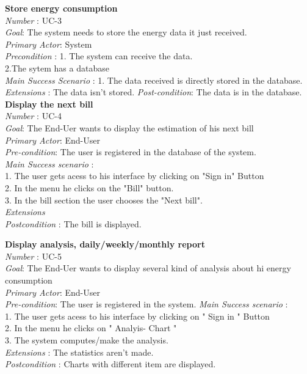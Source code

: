 \textbf{Store energy consumption}\\
\textit{Number} : UC-3 \\
\textit{Goal}: The system needs to store the energy data it just received. \\
\textit{Primary Actor}: System \\
\textit{Precondition} : 1. The system can receive the data. \\
2.The sytem has a database \\
\textit{Main Success Scenario} : 1. The data received is directly stored in the database. \\
\textit{Extensions} : The data isn't stored. %
\textit{Post-condition}: The data is in the database.\\

\textbf{Display the next bill}\\
\textit{Number} : UC-4 \\
\textit{Goal}: The End-Uer wants to display the estimation of his next bill \\ 
\textit{Primary Actor}:  End-User \\
\textit{Pre-condition}: The user is registered in the database of the system.\\
\textit{Main Success scenario} : \\
1. The user gets acess to his interface by clicking on "Sign in" Button\\ %
2. In the menu he clicks on the "Bill" button.\\
3. In the bill section the user chooses the "Next bill". \\ %
\textit{Extensions} \\
\textit{Postcondition} : The bill is displayed.

\textbf{Display analysis, daily/weekly/monthly report}\\ %
\textit{Number} : UC-5 \\
\textit{Goal}: The End-Uer wants to display several kind of analysis about hi energy consumption \\ 
\textit{Primary Actor}: End-User \\
\textit{Pre-condition}: The user is registered in the system.
\textit{Main Success scenario} : \\
1. The user gets acess to his interface by clicking on " Sign in " Button \\
2. In the menu he clicks on " Analyis- Chart " \\ 
3. The system computes/make the analysis. \\
\textit{Extensions} : The statistics aren't made. \\
\textit{Postcondition} : Charts with different item are displayed.

